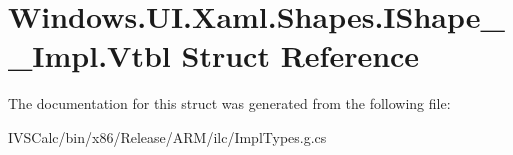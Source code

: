 \hypertarget{struct_windows_1_1_u_i_1_1_xaml_1_1_shapes_1_1_i_shape_____impl_1_1_vtbl}{}\section{Windows.\+U\+I.\+Xaml.\+Shapes.\+I\+Shape\+\_\+\+\_\+\+Impl.\+Vtbl Struct Reference}
\label{struct_windows_1_1_u_i_1_1_xaml_1_1_shapes_1_1_i_shape_____impl_1_1_vtbl}


The documentation for this struct was generated from the following file\+:\begin{DoxyCompactItemize}
\item 
I\+V\+S\+Calc/bin/x86/\+Release/\+A\+R\+M/ilc/Impl\+Types.\+g.\+cs\end{DoxyCompactItemize}
